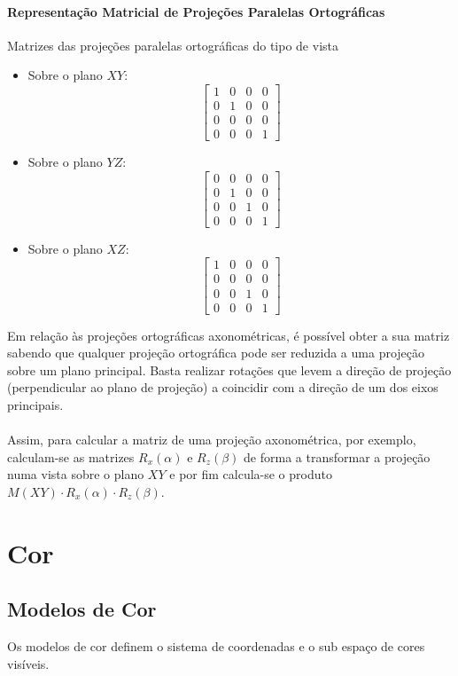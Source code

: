 \documentclass[10pt,a4paper]{report}
\begin{document}
\subsubsection{Representação Matricial de Projeções Paralelas Ortográficas}
Matrizes das projeções paralelas ortográficas do tipo de vista
\begin{itemize}
\item Sobre o plano $XY$: $$
\begin{bmatrix}
1 & 0 & 0 & 0\\
0 & 1 & 0 & 0\\
0 & 0 & 0 & 0\\
0 & 0 & 0 & 1
\end{bmatrix}
$$
\item Sobre o plano $YZ$: $$
\begin{bmatrix}
0 & 0 & 0 & 0\\
0 & 1 & 0 & 0\\
0 & 0 & 1 & 0\\
0 & 0 & 0 & 1
\end{bmatrix}
$$
\item Sobre o plano $XZ$: $$
\begin{bmatrix}
1 & 0 & 0 & 0\\
0 & 0 & 0 & 0\\
0 & 0 & 1 & 0\\
0 & 0 & 0 & 1
\end{bmatrix}
$$
\end{itemize}
Em relação às projeções ortográficas axonométricas, é possível obter a sua matriz sabendo que qualquer projeção ortográfica pode ser reduzida a uma projeção sobre um plano principal. Basta realizar rotações que levem a direção de projeção (perpendicular ao plano de projeção) a coincidir com a direção de um dos eixos principais.\\
\\
Assim, para calcular a matriz de uma projeção axonométrica, por exemplo, calculam-se as matrizes $R_x(\alpha)$ e $R_z(\beta)$ de forma a transformar a projeção numa vista sobre o plano $XY$ e por fim calcula-se o produto $M(XY) \cdot R_x(\alpha) \cdot R_z(\beta)$.

\chapter{Cor}
\section{Modelos de Cor}
Os modelos de cor definem o sistema de coordenadas e o sub espaço de cores visíveis.
\end{document}
